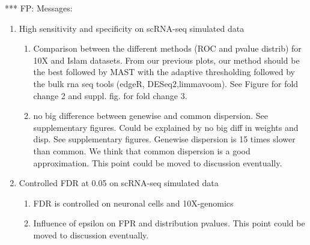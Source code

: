 \documentclass{bmcart}
\begin{document}
{\color{blue} *** FP: Messages:
\begin{enumerate}
\item High sensitivity and specificity on scRNA-seq simulated data
  \begin{enumerate}
  \item Comparison between the different methods (ROC and pvalue distrib) for 10X and Islam datasets. From our previous plots, our method should be the best followed by MAST with the adaptive thresholding followed by the bulk rna seq tools (edgeR, DESeq2,limmavoom). See Figure for fold change 2 and suppl. fig. for fold change 3.
  \item no big difference between genewise and common dispersion. See supplementary figures. Could be explained by no big diff in weights and disp. See supplementary figures. Genewise dispersion is 15 times slower than common. We think that common dispersion is a good approximation. This point could be moved to discussion eventually.
  \end{enumerate}

\item Controlled FDR at 0.05 on scRNA-seq simulated data
  \begin{enumerate}
  \item FDR is controlled on neuronal cells and 10X-genomics
  \item Influence of epsilon on FPR and distribution pvalues. This point could be moved to discussion eventually.
  \end{enumerate}

\end{enumerate}
}
\end{document}
